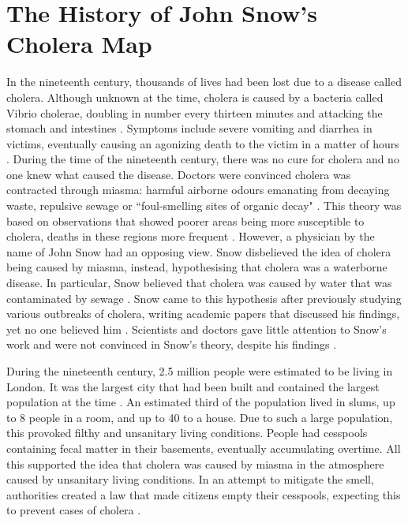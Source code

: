 \documentclass[12pt]{article}
\begin{document}
\section{The History of John Snow's Cholera Map}

In the nineteenth century, thousands of lives had been lost due to a disease called cholera. Although unknown at the time, cholera is caused by a bacteria called Vibrio cholerae, doubling in number every thirteen minutes and attacking the stomach and intestines \cite{channel1}. Symptoms include severe vomiting and diarrhea in victims, eventually causing an agonizing death to the victim in a matter of hours \cite{heros, channel1}. During the time of the nineteenth century, there was no cure for cholera and no one knew what caused the disease. Doctors were convinced cholera was contracted through miasma: harmful airborne odours emanating from decaying waste, repulsive sewage or ``foul-smelling sites of organic decay" \cite{ucla, test}. This theory was based on observations that showed poorer areas being more susceptible to cholera, deaths in these regions more frequent \cite{heros}. However, a physician by the name of John Snow had an opposing view. Snow disbelieved the idea of cholera being caused by miasma, instead, hypothesising that cholera was a waterborne disease. In particular, Snow believed that cholera was caused by water that was contaminated by sewage \cite{ucla}. Snow came to this hypothesis after previously studying various outbreaks of cholera, writing academic papers that discussed his findings, yet no one believed him \cite{original}. Scientists and doctors gave little attention to Snow's work and were not convinced in Snow's theory, despite his findings \cite{ucla}. 

During the nineteenth century, 2.5 million people were estimated to be living in London. It was the largest city that had been built and contained the largest population at the time \cite{channel1, tedtalk}. An estimated third of the population lived in slums, up to 8 people in a room, and up to 40 to a house. Due to such a large population, this provoked filthy and unsanitary living conditions. People had cesspools containing fecal matter in their basements, eventually accumulating overtime. All this supported the idea that cholera was caused by miasma in the atmosphere caused by unsanitary living conditions. In an attempt to mitigate the smell, authorities created a law that made citizens empty their cesspools, expecting this to prevent cases of cholera \cite{tedtalk, johnson}. 
\end{document}
